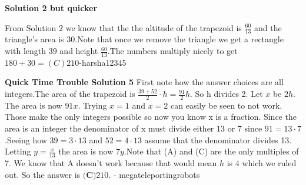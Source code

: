 \begin{enumerate}
\textbf{Solution 2 but quicker}

From Solution $2$ we know that the the altitude of the trapezoid is $\frac{60}{13}$ and the triangle's area is $30$.Note that once we remove the triangle we get a rectangle with length $39$ and height $\frac{60}{13}$.The numbers multiply nicely to get $180+30=\boxed{(C) 210}$-harsha12345

 \textbf{Quick Time Trouble Solution 5} First note how the answer choices are all integers.The area of the trapezoid is $\frac{39+52}{2} \cdot h = \frac{91}{2} h$. So h divides 2. Let $x$ be $2h$. The area is now $91x$. Trying $x=1$ and $x=2$ can easily be seen to not work. Those make the only integers possible so now you know x is a fraction. Since the area is an integer the denominator of x must divide either 13 or 7 since $91 = 13\cdot7$.Seeing how $39 = 3\cdot13$ and $52 = 4\cdot13$ assume that the denominator divides 13. Letting $y = \frac{x}{13}$ the area is now $7y$.Note that (A) and (C) are the only multiples of 7. We know that A doesn't work because that would mean $h$ is $4$ which we ruled out. So the answer is $\boxed{\textbf{(C)} 210}$. - megateleportingrobots

 


\end{enumerate}